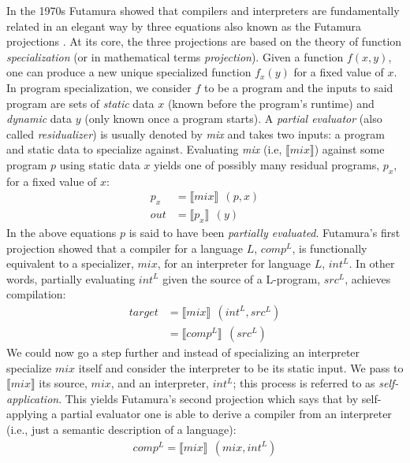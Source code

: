 \documentclass[a4paper,12pt,twoside,openright]{report}
\theoremstyle{definition}
\begin{document}

In the 1970s Futamura showed that compilers and interpreters are fundamentally related in  an elegant way by three equations also known as the Futamura projections \cite{futamura1999partial}. At its core, the three projections are based on the theory of function \textit{specialization} (or in mathematical terms \textit{projection}). Given a function $f(x,y)$, one can produce a new unique specialized function $f_{x}(y)$ for a fixed value of $x$. In program specialization, we consider $f$ to be a program and the inputs to said program are sets of \textit{static} data $x$ (known before the program's runtime) and \textit{dynamic} data $y$ (only known once a program starts). A \textit{partial evaluator} (also called \textit{residualizer}) is usually denoted by \textit{mix} and takes two inputs: a program and static data to specialize against. Evaluating \textit{mix} (i.e, $\llbracket \mathit{mix} \rrbracket$) against some program $p$ using static data $x$ yields one of possibly many residual programs, $p_x$, for a fixed value of $x$:
\begin{align*}
    p_{x} & = \llbracket mix \rrbracket \:\: (p, x) \\
    out & = \llbracket p_{x} \rrbracket \:\: (y)
\end{align*}
In the above equations $p$ is said to have been \textit{partially evaluated}. Futamura's first projection showed that a compiler for a language $L$, $comp^{L}$, is functionally equivalent to a specializer, $mix$, for an interpreter for language $L$, $int^{L}$. In other words, partially evaluating $int^{L}$ given the source of a L-program, $src^{L}$, achieves compilation:
\begin{align*}
    target & = \llbracket mix \rrbracket \:\: (int^{L}, src^{L}) \\
           & = \llbracket comp^{L} \rrbracket \:\: (src^{L})
\end{align*}
We could now go a step further and instead of specializing an interpreter specialize $mix$ itself and consider the interpreter to be its static input. We pass to $\llbracket \mathit{mix} \rrbracket$ its source, $mix$, and an interpreter, $int^L$; this process is referred to as \textit{self-application}. This yields Futamura's second projection which says that by self-applying a partial evaluator one is able to derive a compiler from an interpreter (i.e., just a semantic description of a language):
\begin{align*}
    comp^{L} = \llbracket mix \rrbracket \:\: (mix, int^{L})
\end{align*}
\end{document}
